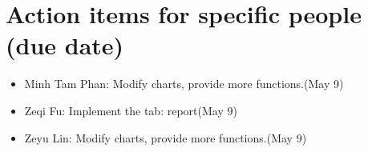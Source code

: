 \documentclass[11pt, a4paper]{article}
\begin{document}
\section{Action items for specific people (due date)}
\begin{itemize}
	\item Minh Tam Phan: Modify charts, provide more functions.(May 9)
	\item Zeqi Fu: Implement the tab: report(May 9)
	\item Zeyu Lin: Modify charts, provide more functions.(May 9)

\end{itemize}
\end{document}
